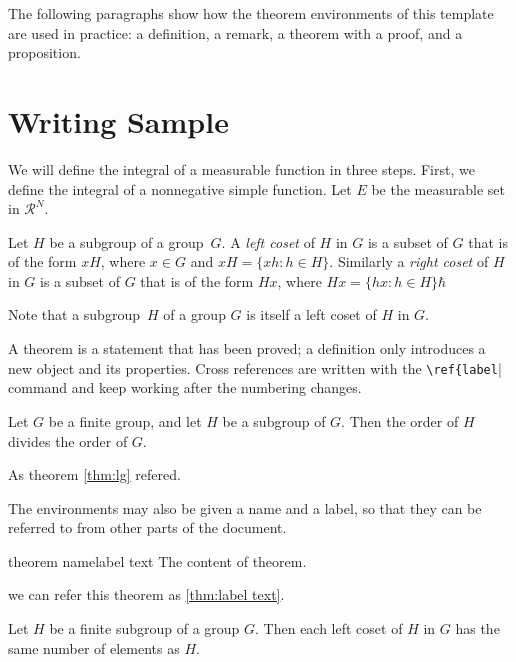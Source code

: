 \documentclass[11pt]{boyogalaelegantbook}
\begin{document}
The following paragraphs show how the theorem environments of this template are used in practice: a definition, a remark, a theorem with a proof, and a proposition.

\section{Writing Sample}

We will define the integral of a measurable function in three steps. First, we define the integral of a nonnegative simple function. Let $E$ be the measurable set in $\mathcal{R}^N$.

\begin{definition}
Let $H$ be a subgroup of a group~$G$.  A \emph{left coset} of $H$ in $G$ is a subset of $G$ that is of the form $xH$, where $x \in G$ and $xH = \{ xh : h \in H \}$. Similarly a \emph{right coset} of $H$ in $G$ is a subset of $G$ that is of the form $Hx$, where $Hx = \{ hx : h \in H \} \hbar$ 
\end{definition}

\begin{note}
Note that a subgroup~$H$ of a group $G$ is itself a left coset of $H$ in $G$.
\end{note}

A theorem is a statement that has been proved; a definition only introduces a new object and its properties.  Cross references are written with the \lstinline|\ref{label|| command and keep working after the numbering changes.

\begin{theorem} \label{thm:lg}
Let $G$ be a finite group, and let $H$ be a subgroup of $G$. Then the order of $H$ divides the order of $G$.
\end{theorem}

As theorem \ref{thm:lg} refered.

The environments may also be given a name and a label, so that they can be referred to from other parts of the document.


\begin{theorem}{theorem name}{label text}
  The content of theorem.
\end{theorem}

we can refer this theorem as \ref{thm:label text}.


\begin{proposition}
Let $H$ be a finite subgroup of a group $G$.  Then each left coset of $H$ in $G$ has the same number of elements as $H$.
\end{proposition}
\end{document}
